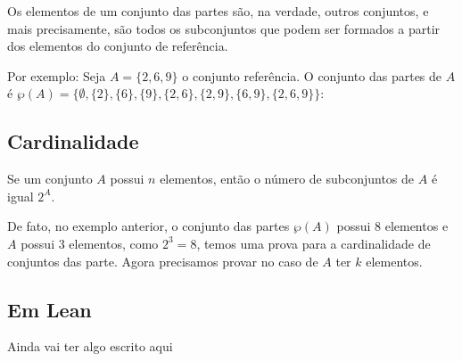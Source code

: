 Os elementos de um conjunto das partes são, na verdade, outros conjuntos, e mais precisamente, são todos os subconjuntos que podem ser formados a partir dos elementos do conjunto de referência.

Por exemplo:  Seja $A = \{2,6,9\}$ o conjunto referência.
O conjunto das partes de $A$ é $\wp(A)
= \{\emptyset,\{2\},\{6\},\{9\},\{2,6\},\{2,9\},\{6,9\},\{2,6,9\}\}$: 

\subsection{Cardinalidade}
Se um conjunto $A$ possui $n$ elementos, então o número de subconjuntos de $A$ é igual $2^A$.

De fato, no exemplo anterior, o conjunto das partes $\wp(A)$ possui 8 elementos e $A$ possui 3 elementos, como $2^3 = 8$, temos uma prova para a cardinalidade de conjuntos das parte.
Agora precisamos provar no caso de $A$ ter $k$ elementos. 


\subsection{Em Lean}
Ainda vai ter algo escrito aqui

